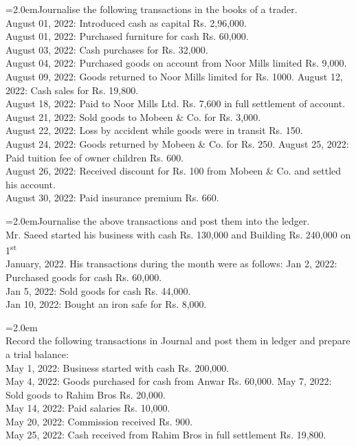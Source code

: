 \documentclass[11pt,a4paper]{article}
\newcommand{\lqn}[2]{\Needspace{6\baselineskip}\par\medskip\noindent\hangindent=2.0em\hangafter=1\makebox[2.0em][l]{\textbf{#1.}}#2\par}
\begin{document}
\lqn{23}{Journalise the following transactions in the books of a trader.\\
August 01, 2022:           Introduced cash as capital Rs. 2,96,000.\\
August 01, 2022:           Purchased furniture for cash Rs. 60,000.\\
August 03, 2022:           Cash purchases for Rs. 32,000.\\
August 04, 2022:           Purchased goods on account from Noor Mills limited Rs. 9,000.\\
August 09, 2022:           Goods returned to Noor Mills limited for Rs. 1000. August 12, 2022:           Cash sales for Rs. 19,800.\\
August 18, 2022:           Paid to Noor Mills Ltd. Rs. 7,600 in full settlement of account.\\
August 21, 2022:           Sold goods to Mobeen \& Co. for Rs. 3,000.\\
August 22, 2022:           Loss by accident while goods were in transit Rs. 150.\\
August 24, 2022:           Goods returned by Mobeen \& Co. for Rs. 250. August 25, 2022:           Paid tuition fee of owner children Rs. 600.\\
August 26, 2022:           Received discount for Rs. 100 from Mobeen \& Co. and settled his account.\\
August 30, 2022:           Paid insurance premium Rs. 660.\par
}
\lqn{24}{Journalise the above transactions and post them into the ledger.\\
Mr. Saeed started his business with cash Rs. 130,000 and Building Rs. 240,000 on 1\textsuperscript{st}\\
January, 2022. His transactions during the month were as follows: Jan 2, 2022:      Purchased goods for cash Rs. 60,000.\\
Jan 5, 2022:      Sold goods for cash Rs. 44,000.\\
Jan 10, 2022:    Bought an iron safe for Rs. 8,000.\par
}
\lqn{25}{\\
Record the following transactions in Journal and post them in ledger and prepare a trial balance:\\
May 1, 2022:     Business started with cash Rs. 200,000.\\
May 4, 2022:     Goods purchased for cash from Anwar Rs. 60,000. May 7, 2022:     Sold goods to Rahim Bros Rs. 20,000.\\
May 14, 2022:   Paid salaries Rs. 10,000.\\
May 20, 2022:   Commission received Rs. 900.\\
May 25, 2022:   Cash received from Rahim Bros in full settlement Rs. 19,800.\par
}
\end{document}
